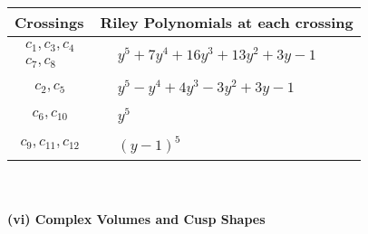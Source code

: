 \documentclass[1p]{elsarticle_modified}
\theoremstyle{definition}
\begin{document}
\begin{tabular}{m{50pt}|m{274pt}}
Crossings & \hspace{64pt}Riley Polynomials at each crossing \\
\hline $$\begin{aligned}c_{1},c_{3},c_{4}\\c_{7},c_{8}\end{aligned}$$&$\begin{aligned}
&y^5+7 y^4+16 y^3+13 y^2+3 y-1
\end{aligned}$\\
\hline $$\begin{aligned}c_{2},c_{5}\end{aligned}$$&$\begin{aligned}
&y^5- y^4+4 y^3-3 y^2+3 y-1
\end{aligned}$\\
\hline $$\begin{aligned}c_{6},c_{10}\end{aligned}$$&$\begin{aligned}
&y^5
\end{aligned}$\\
\hline $$\begin{aligned}c_{9},c_{11},c_{12}\end{aligned}$$&$\begin{aligned}
&(y-1)^5
\end{aligned}$\\
\hline
\end{tabular}\\~\\
\newpage\flushleft \textbf{(vi) Complex Volumes and Cusp Shapes}
\end{document}
